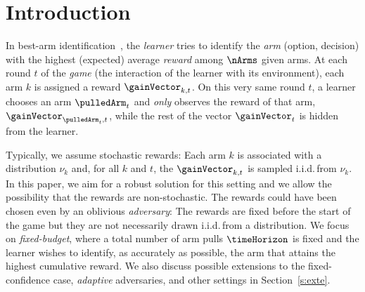 \section{Introduction}
In best-arm identification~\citep{Maron93HR,Bubeck09PE}, 
the \emph{learner} tries to identify the \emph{arm} (option,
decision) with the highest (expected) average \emph{reward} among $\nArms$
given arms.  At each round $t$ of the \emph{game} (the interaction
of the learner with its environment), each arm $k$ is assigned a
reward $\gainVector_{k,t}$. On this very same round $t$, a learner
chooses an arm $\pulledArm_t$ and \emph{only} observes the reward of
that arm, $\gainVector_{\pulledArm_t,t}$, while the rest of the vector
$\gainVector_{t}$ is hidden from the learner.

Typically, we assume stochastic rewards: Each arm $k$ is associated with
a distribution $\nu_k$ and, for all $k$ and $t$, the
$\gainVector_{k,t}$ is sampled i.i.d.\,from $\nu_k$. In this paper, we
aim for a robust solution for this setting and we allow the possibility
that the rewards are non-stochastic. The rewards could  have been chosen even by an oblivious \emph{adversary}: The
rewards are fixed before the start of the game but they are not necessarily
drawn i.i.d.\,from a distribution. We focus on \emph{fixed-budget}, where a
total number of arm pulls $\timeHorizon$ is fixed and the learner
wishes to identify, as accurately as possible, the arm that attains the
highest cumulative reward. We also discuss possible extensions to the fixed-confidence 
case, \textit{adaptive} adversaries, and other settings in Section~\ref{s:exte}. %


